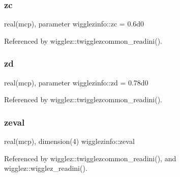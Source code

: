 \subsubsection{\texorpdfstring{zc}{zc}}
{\footnotesize\ttfamily real(mcp), parameter wigglezinfo\+::zc = 0.\+6d0}



Referenced by wigglez\+::twigglezcommon\+\_\+readini().

\mbox{\label{namespacewigglezinfo_aba81e5054787627511da43db2cab3e05}} 
\subsubsection{\texorpdfstring{zd}{zd}}
{\footnotesize\ttfamily real(mcp), parameter wigglezinfo\+::zd = 0.\+78d0}



Referenced by wigglez\+::twigglezcommon\+\_\+readini().

\mbox{\label{namespacewigglezinfo_a8d9180a8b6d6e2d0fee91ed2c96901d1}} 
\subsubsection{\texorpdfstring{zeval}{zeval}}
{\footnotesize\ttfamily real(mcp), dimension(4) wigglezinfo\+::zeval}



Referenced by wigglez\+::twigglezcommon\+\_\+readini(), and wigglez\+::wigglez\+\_\+readini().

